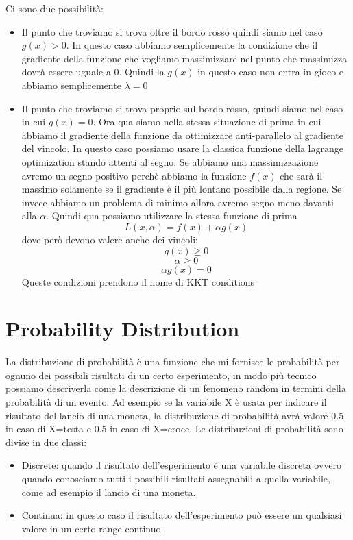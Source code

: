 \documentclass[14pt]{extreport}
\begin{document}
Ci sono due possibilità:

\begin{itemize}

\item Il punto che troviamo si trova oltre il bordo rosso quindi siamo nel caso $g(x) > 0$. In questo caso abbiamo semplicemente la condizione che il
gradiente della funzione che vogliamo massimizzare nel punto che massimizza dovrà essere uguale a 0. Quindi la $g(x)$ in questo caso non entra in
gioco e abbiamo semplicemente $\lambda = 0$
\item Il punto che troviamo si trova proprio sul bordo rosso, quindi siamo nel caso in cui $g(x) = 0$. Ora qua siamo nella stessa situazione di prima
in cui abbiamo il gradiente della funzione da ottimizzare anti-parallelo al gradiente del vincolo. In questo caso possiamo usare la classica funzione
della lagrange optimization stando attenti al segno. Se abbiamo una massimizzazione avremo un segno positivo perchè abbiamo la funzione $f(x)$ che
sarà il massimo solamente se il gradiente è il più lontano possibile dalla regione. Se invece abbiamo un problema di minimo allora avremo segno meno
davanti alla $\alpha$. Quindi qua possiamo utilizzare la stessa funzione di prima $$L(x, \alpha) = f(x) + \alpha g(x)$$ dove però devono valere anche
dei vincoli: $$g(x) \geq 0$$ $$\alpha \geq 0$$ $$\alpha g(x) = 0$$ Queste condizioni prendono il nome di KKT conditions
\end{itemize}


\section{Probability Distribution}

La distribuzione di probabilità è una funzione che mi fornisce le probabilità per ognuno dei possibili risultati di un certo esperimento, in modo più
tecnico possiamo descriverla come la descrizione di un fenomeno random in termini della probabilità di un evento. Ad esempio se la variabile X è usata
per indicare il risultato del lancio di una moneta, la distribuzione di probabilità avrà valore 0.5 in caso di X=testa e 0.5 in caso di X=croce. Le
distribuzioni di probabilità sono divise in due classi:
\begin{itemize}
\item Discrete: quando il risultato dell'esperimento è una variabile discreta ovvero quando conosciamo tutti i possibili risultati assegnabili a
quella variabile, come ad esempio il lancio di una moneta.
\item Continua: in questo caso il risultato dell'esperimento può essere un qualsiasi valore in un certo range continuo.
\end{itemize}
\end{document}

